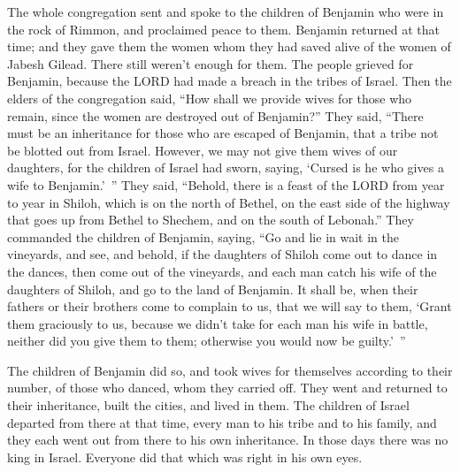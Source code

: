 \myverse{}The whole congregation sent and spoke to the children of Benjamin
who were in the rock of Rimmon, and proclaimed peace to them.
\myverse{}Benjamin returned at that time; and they gave them the women whom they had
saved alive of the women of Jabesh Gilead. There still weren’t enough for them.
\myverse{}The people grieved for Benjamin, because the LORD had made a breach in the
tribes of Israel.
\myverse{}Then the elders of the congregation said, “How shall we provide wives for
those who remain, since the women are destroyed out of Benjamin?”
\myverse{}They said, “There must be an inheritance for those who are escaped of Benjamin,
that a tribe not be blotted out from Israel.
\myverse{}However, we may not give them wives of our daughters, for the children of
Israel had sworn, saying, ‘Cursed is he who gives a wife to Benjamin.’ ”
\myverse{}They said, “Behold, there is a feast of the LORD from year to year in Shiloh,
which is on the north of Bethel, on the east side of the highway that goes up from Bethel to Shechem,
and on the south of Lebonah.”
\myverse{}They commanded the children of Benjamin, saying, “Go and lie in wait in the
vineyards,
\myverse{}and see, and behold, if the daughters of Shiloh come out to dance in the
dances, then come out of the vineyards, and each man catch his wife of the daughters of Shiloh, and go
to the land of Benjamin.
\myverse{}It shall be, when their fathers or their brothers come to complain to us,
that we will say to them, ‘Grant them graciously to us, because we didn’t take for each man his wife in
battle, neither did you give them to them; otherwise you would now be guilty.’ ”

\myverse{}The children of Benjamin did so, and took wives for themselves
according to their number, of those who danced, whom they carried off. They went and returned to their
inheritance, built the cities, and lived in them.
\myverse{}The children of Israel departed from there at that time, every man to his
tribe and to his family, and they each went out from there to his own inheritance.
\myverse{}In those days there was no king in Israel. Everyone did that which was right
in his own eyes.
